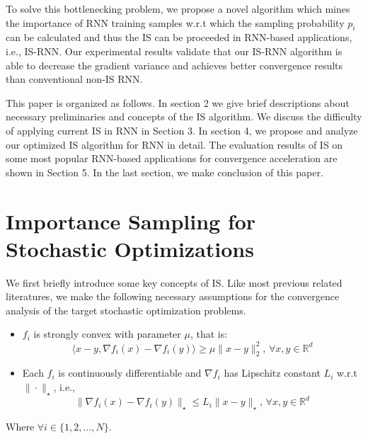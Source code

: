 \documentclass[twoside,leqno,twocolumn]{article}
\begin{document}
To solve this bottlenecking problem, we propose a novel algorithm which mines the importance of RNN training samples w.r.t which the sampling probability $p_i$ can be calculated and thus the IS can be proceeded in RNN-based applications, i.e., IS-RNN. Our experimental results validate that our IS-RNN algorithm is able to decrease the gradient variance and achieves better convergence results than conventional non-IS RNN.

This paper is organized as follows. In section 2 we give brief descriptions about necessary preliminaries and concepts of the IS algorithm. We discuss the difficulty of applying current IS in RNN in Section 3. In section 4, we propose and analyze our optimized IS algorithm for RNN in detail. The evaluation results of IS on some most popular RNN-based applications for convergence acceleration are shown in Section 5. In the last section, we make conclusion of this paper.


\section{Importance Sampling for Stochastic Optimizations}
We first briefly introduce some key concepts of IS. Like most previous related literatures, we make the following necessary assumptions for the convergence analysis of the target stochastic optimization problems.
\begin{itemize}
	\item $f_i$ is strongly convex with parameter $\mu$, that is:
	\begin{equation}
	\label{convexity}
	\langle x-y,\nabla f_i(x)-\nabla f_i(y) \rangle \ge \mu \|x-y\|_2^2, \, \forall x,y \in \mathbb{R}^d
	\end{equation}
	\item Each $f_i$ is continuously differentiable and $\nabla f_i$ has Lipschitz constant $L_i$ w.r.t $\|\cdot\|_{\star}$, i.e.,
	\begin{equation}
	\label{continuity}
	\|\nabla f_i(x)-\nabla f_i(y)\|_{\star}\le L_i\|x-y\|_{\star}, \, \forall x, y \in \mathbb{R}^d
	\end{equation}
\end{itemize}
Where $\forall i \in \{1,2,...,N\}$.
\end{document}

